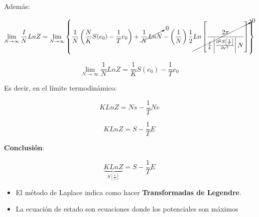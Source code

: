 \documentclass{article}
\begin{document}
Además:

\[ \lim\limits_{N \to \infty}  \frac{I}{N} Ln Z = \lim\limits_{N \to \infty} \left\{ \frac{1}{N} \left(  \frac{N}{K}S(e_{0}) - \frac{1}{T}e_{0} \right) +  \cancelto{0}{\frac{1}{N}Ln N} - \left(  \frac{1}{N} \right)\frac{1}{2} \cancelto{0}{Ln \left[ \frac{2\pi }{ \frac{1}{k} \left| \frac{\partial^{2}S\left[ \frac{1}{T} \right] }{\partial e^{2}}\right|N}  \right] }  \right\} \]

\[\lim\limits_{N \to \infty } \frac{1}{N} Ln Z = \frac{1}{K} S(e_{0}) -\frac{1}{T}e_{0} \]

Es decir, en el límite termodinámico:


\[ KLn Z = Ns  -\frac{1}{T} Ne \]

\[ KLnZ=S - \frac{1}{T}E \]

\textcolor{Cinnabar}{\textbf{Conclusión}}:

\[ \underbrace{KLn Z}_{S\left[ \frac{1}{T}  \right]} = S - \frac{1}{T} E \]

\begin{itemize}
\item[$\star$] El método de Laplace indica como hacer \textbf{Transformadas de Legendre}.\\
\item[$\star$] La ecuación de estado son ecuaciones donde los potenciales son máximos
\end{itemize}
\end{document}
